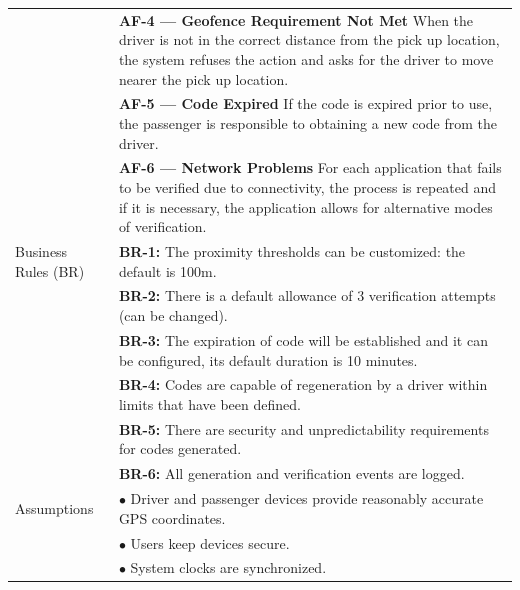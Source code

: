\begin{longtable}{|>{\raggedright\arraybackslash}p{4cm}|>{\raggedright\arraybackslash}p{11cm}|}
& \textbf{AF-4 — Geofence Requirement Not Met} \newline When the driver is not in the correct distance from the pick up location, the system refuses the action and asks for the driver to move nearer the pick up location. \\
& \textbf{AF-5 — Code Expired} \newline If the code is expired prior to use, the passenger is responsible to obtaining a new code from the driver. \\
& \textbf{AF-6 — Network Problems} \newline For each application that fails to be verified due to connectivity, the process is repeated and if it is necessary, the application allows for alternative modes of verification. \\
\hline
Business Rules (BR) 
& \textbf{BR-1:} The proximity thresholds can be customized: the default is 100m. \\
& \textbf{BR-2:} There is a default allowance of 3 verification attempts (can be changed). \\
& \textbf{BR-3:} The expiration of code will be established and it can be configured, its default duration is 10 minutes. \\
& \textbf{BR-4:} Codes are capable of regeneration by a driver within limits that have been defined. \\
& \textbf{BR-5:} There are security and unpredictability requirements for codes generated. \\
& \textbf{BR-6:} All generation and verification events are logged. \\
\hline
Assumptions & $\bullet$ Driver and passenger devices provide reasonably accurate GPS coordinates. \\
& $\bullet$ Users keep devices secure. \\
& $\bullet$ System clocks are synchronized. \\
\hline
\end{longtable}

